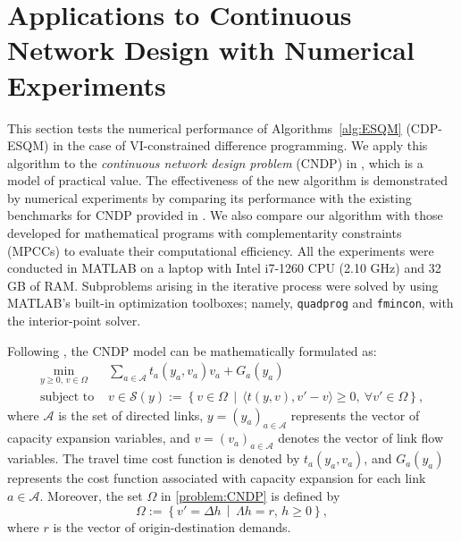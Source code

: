\documentclass[11pt,a4paper]{article}
\theoremstyle{plain}
\begin{document}
\section{Applications to Continuous Network Design with Numerical Experiments}\label{sec:num}
\setcounter{equation}{0}

This section tests the numerical performance of Algorithms~\ref{alg:ESQM} (CDP-ESQM) in the case of VI-constrained  difference programming. We apply {this algorithm} to the {\em continuous network design problem} (CNDP) in \cite{abdulaal1979continuous}, which is a model of practical value. The effectiveness of the new {algorithm} is demonstrated by numerical experiments by comparing {its} performance with the existing benchmarks for CNDP provided in \cite{suwansirikul1987edo}. We also compare {our algorithm} with those developed for mathematical programs with complementarity constraints (MPCCs) to evaluate their computational efficiency.  All the experiments were conducted in MATLAB on a laptop with Intel i7-1260 CPU (2.10 GHz) and 32 GB of RAM. Subproblems arising in the iterative process were solved by using MATLAB's built-in optimization toolboxes; namely, \texttt{quadprog} and \texttt{fmincon}, with the interior-point solver.

Following \cite{abdulaal1979continuous,marcotte1986network}, the CNDP model can be mathematically formulated as:
\begin{equation}\label{problem:CNDP}
\begin{aligned}
\min\limits_{y\geq0,\, v\in\Omega}\, &  \sum\limits_{a \in \mathcal{A}} t_a(y_a, v_a) v_a 
+G_a(y_a) \\
\text{subject to } &  v \in \mathcal{S}(y):=\left\{
v\in\Omega\,\middle|\, 
\langle t(y,v),v'-v\rangle\geq0,\ \forall v'\in\Omega
\right\},
\end{aligned}
\end{equation}
where \(\mathcal{A}\) is the set of directed links, 
\(y = (y_a)_{a \in \mathcal{A}}\) represents the vector of capacity expansion variables, 
and \(v = (v_a)_{a \in \mathcal{A}}\) denotes the vector of link flow variables. 
The travel time cost function is denoted by \(t_a(y_a, v_a)\), 
and \(G_a(y_a)\) represents the cost function associated with capacity expansion 
for each link \(a \in \mathcal{A}\). Moreover, the set $\Omega$ in \eqref{problem:CNDP} is defined by
\begin{equation}
\Omega:=\left\{v'=\Delta h\,\middle|\,\Lambda h=r,\,h\geq0\right\},
\end{equation}
where \(r\) is the vector of origin-destination demands. 
\end{document}

